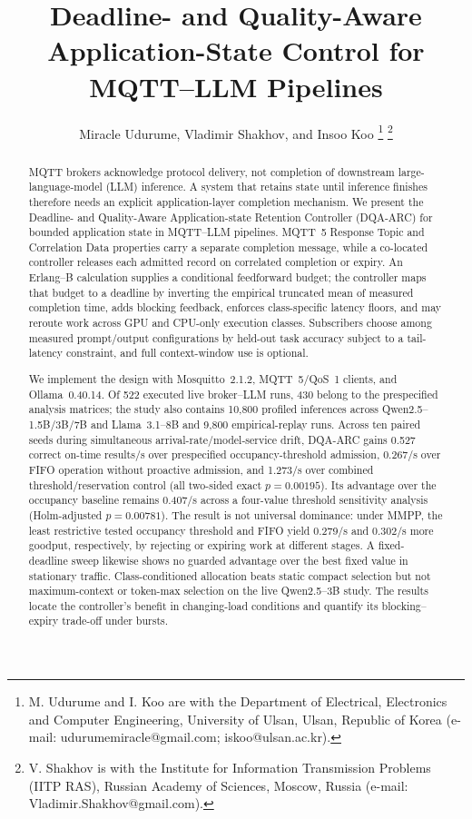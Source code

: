 \documentclass[journal]{IEEEtran}
\title{Deadline- and Quality-Aware Application-State Control for MQTT--LLM Pipelines}
\author{Miracle Udurume, Vladimir Shakhov, and Insoo Koo%
\thanks{M. Udurume and I. Koo are with the Department of Electrical, Electronics and Computer Engineering, University of Ulsan, Ulsan, Republic of Korea (e-mail: udurumemiracle@gmail.com; iskoo@ulsan.ac.kr).}%
\thanks{V. Shakhov is with the Institute for Information Transmission Problems (IITP RAS), Russian Academy of Sciences, Moscow, Russia (e-mail: Vladimir.Shakhov@gmail.com).}}
\newcommand{\method}{DQA-ARC}
\begin{document}
\maketitle

\begin{abstract}
MQTT brokers acknowledge protocol delivery, not completion of downstream large-language-model (LLM) inference. A system that retains state until inference finishes therefore needs an explicit application-layer completion mechanism. We present the Deadline- and Quality-Aware Application-state Retention Controller (\method{}) for bounded application state in MQTT--LLM pipelines. MQTT~5 Response Topic and Correlation Data properties carry a separate completion message, while a co-located controller releases each admitted record on correlated completion or expiry. An Erlang--B calculation supplies a conditional feedforward budget; the controller maps that budget to a deadline by inverting the empirical truncated mean of measured completion time, adds blocking feedback, enforces class-specific latency floors, and may reroute work across GPU and CPU-only execution classes. Subscribers choose among measured prompt/output configurations by held-out task accuracy subject to a tail-latency constraint, and full context-window use is optional.

We implement the design with Mosquitto~2.1.2, MQTT~5/QoS~1 clients, and Ollama~0.40.14. Of 522 executed live broker--LLM runs, 430 belong to the prespecified analysis matrices; the study also contains 10,800 profiled inferences across Qwen2.5--1.5B/3B/7B and Llama~3.1--8B and 9,800 empirical-replay runs. Across ten paired seeds during simultaneous arrival-rate/model-service drift, \method{} gains 0.527 correct on-time results/s over prespecified occupancy-threshold admission, 0.267/s over FIFO operation without proactive admission, and 1.273/s over combined threshold/reservation control (all two-sided exact $p=0.00195$). Its advantage over the occupancy baseline remains 0.407/s across a four-value threshold sensitivity analysis (Holm-adjusted $p=0.00781$). The result is not universal dominance: under MMPP, the least restrictive tested occupancy threshold and FIFO yield 0.279/s and 0.302/s more goodput, respectively, by rejecting or expiring work at different stages. A fixed-deadline sweep likewise shows no guarded advantage over the best fixed value in stationary traffic. Class-conditioned allocation beats static compact selection but not maximum-context or token-max selection on the live Qwen2.5--3B study. The results locate the controller's benefit in changing-load conditions and quantify its blocking--expiry trade-off under bursts.
\end{abstract}
\end{document}

